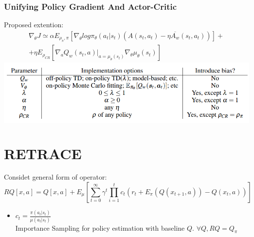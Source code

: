 \documentclass{beamer}
\begin{document}
\begin{frame}[t]
\frametitle{Unifying Policy Gradient And Actor-Critic}

Proposed extention:
\begin{multline*}
\nabla_{\theta} J \simeq \alpha E_{\rho_\pi, \pi} \left[ \nabla_{\theta} log \pi_\theta ( a_t | s_t) (A(s_t, a_t) - \eta \overline{A_w} (s_t,a_t)) \right] + \\ + \eta E_{\rho_{CR}} \left[ \nabla_a Q_w(s_t, a) |_{a=\mu_\theta(s_t)} 
\nabla_\theta \mu_\theta(s_t)
\right]
\end{multline*}
\includegraphics[scale=0.37]{extention}

\end{frame}

\section{RETRACE}

\begin{frame}[t]
Considet general form of operator:
\begin{equation*}
R Q [x,a] = Q[x,a] + E_\mu \left[ \sum_{t=0}^\infty \gamma^t \prod_{i=1}^{t} c_t \left( r_t + E_\pi(Q(x_{t+1},a)) - Q(x_t,a) \right) \right]
\end{equation*}

\begin{itemize}
\item $c_t = \frac{\pi(a_t | s_t) }{\mu(a_t | s_t)}$ \\
Importance Sampling for policy estimation with baseline $Q$. $\forall Q,  R Q = Q_\pi$

\end{itemize}

\end{frame}
\end{document}
